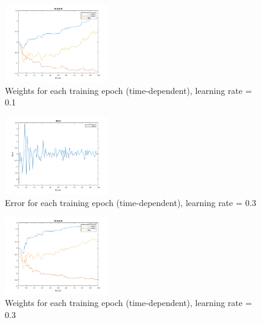 \documentclass{IEEEtran}
\begin{document}
\begin{centering}
\begin{figure}
\begin{center}
	\includegraphics[width=0.4\textwidth]{weights_time_01lr}
	\caption{Weights for each training epoch (time-dependent), learning rate = 0.1\label{fig:wgt01time}}
\end{center}
\end{figure}
\end{centering}

\begin{centering}
\begin{figure}
\begin{center}
	\includegraphics[width=0.4\textwidth]{error_time_03lr}
	\caption{Error for each training epoch (time-dependent), learning rate = 0.3\label{fig:err03time}}
\end{center}
\end{figure}
\end{centering}

\begin{centering}
\begin{figure}
\begin{center}
	\includegraphics[width=0.4\textwidth]{weights_time_03lr}
	\caption{Weights for each training epoch (time-dependent), learning rate = 0.3\label{fig:wgt03time}}
\end{center}
\end{figure}
\end{centering}
\end{document}
